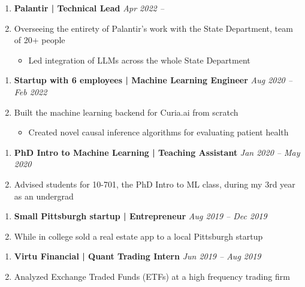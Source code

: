 \documentclass[letterpaper,11pt]{article}
\newcommand{\resitem}[1]{\item #1 \vspace{-2pt}}
\begin{document}
\begin{enumerate}[leftmargin=10pt]
	\item[] \textbf{\Large Palantir | \textcolor{myBlue}{Technical Lead}}  \cftdotfill{\cftdotsep} \large \textit{\textcolor{myBlue}{Apr 2022 --}}\\
	\item[] \large Overseeing the entirety of Palantir's work with the State Department, team of 20+ people
	\begin{itemize}
		\resitem{Led integration of LLMs across the whole State Department}
	\end{itemize}
\end{enumerate}

\begin{enumerate}[leftmargin=10pt]
	\item[] \textbf{\Large Startup with 6 employees | \textcolor{myBlue}{Machine Learning Engineer}}  \cftdotfill{\cftdotsep} \large \textit{\textcolor{myBlue}{Aug 2020 --} Feb 2022}\\
	\item[] \large Built the machine learning backend for Curia.ai from scratch
	\begin{itemize}
		\resitem{Created novel causal inference algorithms for evaluating patient health}
	\end{itemize}
\end{enumerate}

\begin{enumerate}[leftmargin=10pt]
	\item[] \textbf{\Large PhD Intro to Machine Learning | \textcolor{myBlue}{Teaching Assistant}}  \cftdotfill{\cftdotsep} \large \textit{\textcolor{myBlue}{Jan 2020 --} May 2020}\\
	\item[] \large Advised students for 10-701, the PhD Intro to ML class, during my 3rd year as an undergrad
\end{enumerate}

\begin{enumerate}[leftmargin=10pt]
	\item[] \textbf{\Large Small Pittsburgh startup | \textcolor{myBlue}{Entrepreneur}}  \cftdotfill{\cftdotsep} \large \textit{\textcolor{myBlue}{Aug 2019 --} Dec 2019}\\
	\item[] \large While in college sold a real estate app to a local Pittsburgh startup
\end{enumerate}

\begin{enumerate}[leftmargin=10pt]
	\item[] \textbf{\Large Virtu Financial | \textcolor{myBlue}{Quant Trading Intern}}  \cftdotfill{\cftdotsep} \large \textit{\textcolor{myBlue}{Jun 2019 --} Aug 2019}\\
	\item[] \large Analyzed Exchange Traded Funds (ETFs) at a high frequency trading firm
\end{enumerate}
\end{document}
